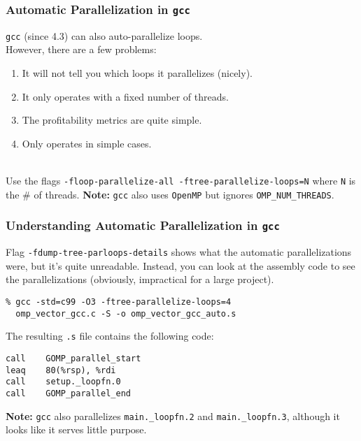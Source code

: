 \begin{frame}[fragile]
  \frametitle{Automatic Parallelization in {\tt gcc}}


  {\tt gcc} (since 4.3) can also auto-parallelize loops. \\
  However, there are
      a few problems:
      \begin{enumerate}
        \item It will not tell you which loops it parallelizes (nicely).
        \item It only operates with a fixed number of threads.
        \item The profitability metrics are quite simple.
        \item Only operates in simple cases.
      \end{enumerate}
   ~\\[1em]

  Use the flags {\tt -floop-parallelize-all -ftree-parallelize-loops=N} where {\tt N} is the \# of
  threads.
  \vfill
  {\bf Note:} {\tt gcc} also uses {\tt OpenMP} but ignores
  {\tt OMP\_NUM\_THREADS}.


\end{frame}

\begin{frame}[fragile]
  \frametitle{Understanding Automatic Parallelization in {\tt gcc}}


  Flag {\tt -fdump-tree-parloops-details} shows what the automatic
  parallelizations were, but it's quite unreadable.
  \vfill
  Instead, you can look at the assembly code to see the parallelizations
  (obviously, impractical for a large project).
  \begin{lstlisting}
% gcc -std=c99 -O3 -ftree-parallelize-loops=4
  omp_vector_gcc.c -S -o omp_vector_gcc_auto.s
  \end{lstlisting}
  \vfill
  The resulting {\tt .s} file contains the following code:
  \begin{lstlisting}
call    GOMP_parallel_start
leaq    80(%rsp), %rdi
call    setup._loopfn.0
call    GOMP_parallel_end
  \end{lstlisting}
  \vfill
  {\bf Note:} {\tt gcc} also parallelizes {\tt main.\_loopfn.2} and
  {\tt main.\_loopfn.3}, although it looks like it serves little purpose.


\end{frame}

